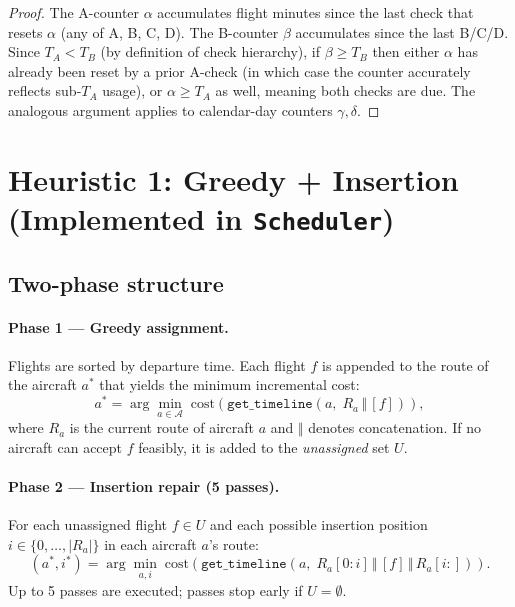 \documentclass[11pt, a4paper]{article}
\theoremstyle{plain}
\theoremstyle{definition}
\theoremstyle{remark}
\newcommand{\Ac}{\mathcal{A}}
\begin{document}
\begin{proof}
  The A-counter $\alpha$ accumulates flight minutes since the last check that
  resets $\alpha$ (any of A, B, C, D).  The B-counter $\beta$ accumulates since
  the last B/C/D.  Since $T_A < T_B$ (by definition of check hierarchy), if
  $\beta \ge T_B$ then either $\alpha$ has already been reset by a prior
  A-check (in which case the counter accurately reflects sub-$T_A$ usage), or
  $\alpha \ge T_A$ as well, meaning both checks are due.  The analogous
  argument applies to calendar-day counters $\gamma, \delta$.
\end{proof}

\section{Heuristic 1: Greedy + Insertion (Implemented in \texttt{Scheduler})}

\subsection{Two-phase structure}

\paragraph{Phase 1 — Greedy assignment.}
Flights are sorted by departure time.  Each flight $f$ is appended to the
route of the aircraft $a^*$ that yields the minimum incremental cost:
\begin{equation}
  a^* = \arg\min_{a \in \Ac} \;\mathrm{cost}\!\left(\texttt{get\_timeline}(a,\;
    R_a \,\Vert\, [f])\right),
\end{equation}
where $R_a$ is the current route of aircraft $a$ and $\Vert$ denotes
concatenation.  If no aircraft can accept $f$ feasibly, it is added to the
\emph{unassigned} set $U$.

\paragraph{Phase 2 — Insertion repair (5 passes).}
For each unassigned flight $f \in U$ and each possible insertion position
$i \in \{0,\ldots,|R_a|\}$ in each aircraft $a$'s route:
\begin{equation}
  (a^*, i^*) = \arg\min_{a,i}\; \mathrm{cost}\!\left(
    \texttt{get\_timeline}(a,\;R_a[0:i] \,\Vert\, [f] \,\Vert\, R_a[i:])\right).
\end{equation}
Up to 5 passes are executed; passes stop early if $U = \emptyset$.
\end{document}
